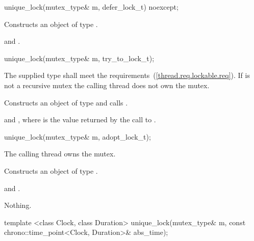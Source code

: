 %
\begin{itemdecl}
unique_lock(mutex_type& m, defer_lock_t) noexcept;
\end{itemdecl}

\begin{itemdescr}
\pnum
\effects Constructs an object of type .

\pnum
\postconditions {} and .
\end{itemdescr}

%
\begin{itemdecl}
unique_lock(mutex_type& m, try_to_lock_t);
\end{itemdecl}

\begin{itemdescr}
\pnum
\precondition
The supplied  type shall meet the 
requirements~(\ref{thread.req.lockable.req}).
If  is not a recursive mutex the calling thread does not own the mutex.

\pnum
\effects Constructs an object of type  and calls .

\pnum
\postconditions {} and ,
where  is the value returned by the call to .
\end{itemdescr}

%
\begin{itemdecl}
unique_lock(mutex_type& m, adopt_lock_t);
\end{itemdecl}

\begin{itemdescr}
\pnum
\precondition The calling thread owns the mutex.

\pnum
\effects Constructs an object of type .

\pnum
\postconditions {} and .

\pnum
\throws Nothing.
\end{itemdescr}

%
\begin{itemdecl}
template <class Clock, class Duration>
  unique_lock(mutex_type& m, const chrono::time_point<Clock, Duration>& abs_time);
\end{itemdecl}

